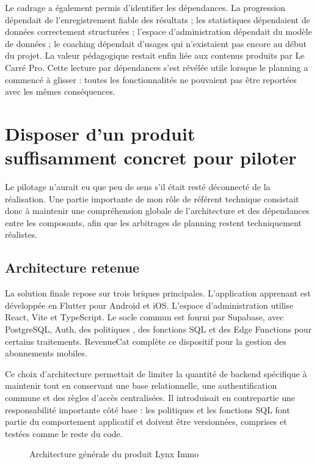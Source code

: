 Le cadrage a également permis d'identifier les dépendances. La progression dépendait de l'enregistrement fiable des résultats ; les statistiques dépendaient de données correctement structurées ; l'espace d'administration dépendait du modèle de données ; le coaching dépendait d'usages qui n'existaient pas encore au début du projet. La valeur pédagogique restait enfin liée aux contenus produits par Le Carré Pro. Cette lecture par dépendances s'est révélée utile lorsque le planning a commencé à glisser : toutes les fonctionnalités ne pouvaient pas être reportées avec les mêmes conséquences.

\section{Disposer d'un produit suffisamment concret pour piloter}

Le pilotage n'aurait eu que peu de sens s'il était resté déconnecté de la réalisation. Une partie importante de mon rôle de référent technique consistait donc à maintenir une compréhension globale de l'architecture et des dépendances entre les composants, afin que les arbitrages de planning restent techniquement réalistes.



\subsection{Architecture retenue}

La solution finale repose sur trois briques principales. L'application apprenant est développée en Flutter pour Android et iOS. L'espace d'administration utilise React, Vite et TypeScript. Le socle commun est fourni par Supabase, avec PostgreSQL, Auth, des politiques , des fonctions SQL et des Edge Functions pour certains traitements. RevenueCat complète ce dispositif pour la gestion des abonnements mobiles.

Ce choix d'architecture permettait de limiter la quantité de backend spécifique à maintenir tout en conservant une base relationnelle, une authentification commune et des règles d'accès centralisées. Il introduisait en contrepartie une responsabilité importante côté base : les politiques  et les fonctions SQL font partie du comportement applicatif et doivent être versionnées, comprises et testées comme le reste du code.

\begin{figure}[H]
\centering
{}
\caption{Architecture générale du produit Lynx Immo}
\label{fig:lynx-architecture}
\end{figure}

